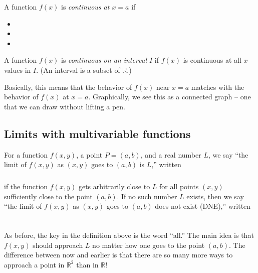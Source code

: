\vfill

\pagebreak 

\begin{defn}
    A function $f(x)$ is \emph{continuous at $x=a$} if
    \begin{multicols}{3}
    \begin{itemize}
        \item {}
        \item {}
        \item {}
    \end{itemize}
    \end{multicols}
\end{defn}

\begin{defn}
    A function $f(x)$ is \emph{continuous on an interval $I$} if $f(x)$ is continuous at all $x$ values in $I$. (An interval is a subset of $\mathbb{R}$.)
\end{defn}

Basically, this means that the behavior of $f(x)$ near $x=a$ matches with the behavior of $f(x)$ at $x=a$. Graphically, we see this as a connected graph -- one that we can draw without lifting a pen.

\subsection{Limits with multivariable functions}
\begin{defn}[Limit]
    For a function $f(x,y)$, a point $P=(a,b)$, and a real number $L$, we say ``the limit of $f(x,y)$ as $(x,y)$ goes to $(a,b)$ is $L$,'' written 
    \[
        \phantom{\lim\limits_{(x,y)\to(a,b)}f(x,y)=L,}
    \] 
    if the function $f(x,y)$ gets arbitrarily close to $L$ for all points $(x,y)$ sufficiently close to the point $(a,b)$. If no such number $L$ exists, then we say ``the limit of $f(x,y)$ as $(x,y)$ goes to $(a,b)$ does not exist (DNE),'' written
    \[
        \phantom{\lim\limits_{(x,y)\to(a,b)}f(x,y)\text{ DNE}.}
    \]
\end{defn}

As before, the key in the definition above is the word ``all.'' The main idea is that $f(x,y)$ should approach $L$ no matter how one goes to the point $(a,b)$. The difference between now and earlier is that there are so many more ways to approach a point in $\mathbb{R}^2$ than in $\mathbb{R}$!


